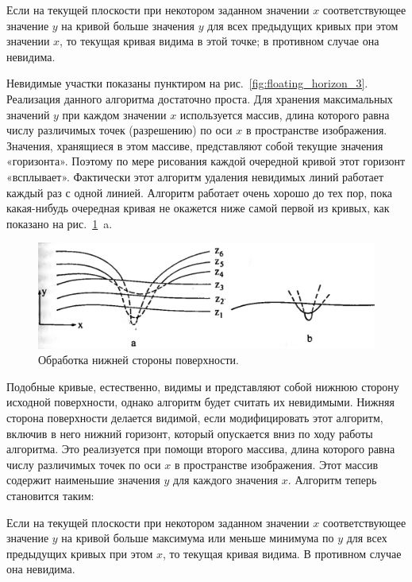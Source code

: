 Если на текущей плоскости при некотором заданном значении \( x \) соответствующее значение \( y \) на кривой больше значения \( y \) для всех предыдущих кривых при этом значении \( x \), то текущая кривая видима в этой точке; в противном случае она невидима.

Невидимые участки показаны пунктиром на рис.~\ref{fig:floating_horizon_3}. Реализация данного алгоритма достаточно проста. Для хранения максимальных значений \( y \) при каждом значении \( x \) используется массив, длина которого равна числу различимых точек (разрешению) по оси \( x \) в пространстве изображения. Значения, хранящиеся в этом массиве, представляют собой текущие значения «горизонта». Поэтому по мере рисования каждой очередной кривой этот горизонт «всплывает». Фактически этот алгоритм удаления невидимых линий работает каждый раз с одной линией. Алгоритм работает очень хорошо до тех пор, пока какая-нибудь очередная кривая не окажется ниже самой первой из кривых, как показано на рис.~\ref{fig:floating_horizon_4}~a.

\begin{figure}[H]
    \centering
    \includegraphics[width=\textwidth]{img/floating_horizon_4.png}
    \caption{Обработка нижней стороны поверхности.}
    \label{fig:floating_horizon_4}
\end{figure}

Подобные кривые, естественно, видимы и представляют собой нижнюю сторону исходной поверхности, однако алгоритм будет считать их невидимыми. Нижняя сторона поверхности делается видимой, если модифицировать этот алгоритм, включив в него нижний горизонт, который опускается вниз по ходу работы алгоритма. Это реализуется при помощи второго массива, длина которого равна числу различимых точек по оси \( x \) в пространстве изображения. Этот массив содержит наименьшие значения \( y \) для каждого значения \( x \). Алгоритм теперь становится таким:

Если на текущей плоскости при некотором заданном значении \( x \) соответствующее значение \( y \) на кривой больше максимума или меньше минимума по \( y \) для всех предыдущих кривых при этом \( x \), то текущая кривая видима. В противном случае она невидима.

